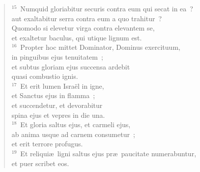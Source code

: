 \begin{flushleft}
\begin{verse}
${}^{15}$~Numquid gloriabitur securis contra eum qui secat in ea~?\\ aut exaltabitur serra contra eum a quo trahitur~?\\ Quomodo si elevetur virga contra elevantem se,\\ et exaltetur baculus, qui utique lignum est.\\
${}^{16}$~Propter hoc mittet Dominator, Dominus exercituum,\\ in pinguibus ejus tenuitatem~;\\ et subtus gloriam ejus succensa ardebit\\ quasi combustio ignis.\\
${}^{17}$~Et erit lumen Isra\"el in igne,\\ et Sanctus ejus in flamma~;\\ et succendetur, et devorabitur\\ spina ejus et vepres in die una.\\
${}^{18}$~Et gloria saltus ejus, et carmeli ejus,\\ ab anima usque ad carnem consumetur~;\\ et erit terrore profugus.\\
${}^{19}$~Et reliqui\ae\ ligni saltus ejus pr\ae\ paucitate numerabuntur,\\ et puer scribet eos.\end{verse}\end{flushleft}


